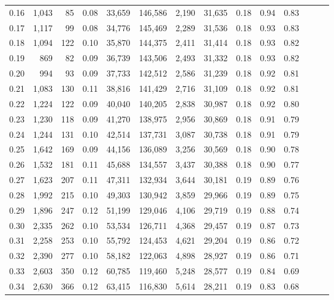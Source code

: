 \begin{tabular}{rrrrrrrrrrrrrr}
0.16 &  1,043 &   85 &  0.08 &   33,659 &  146,586 &   2,190 &  31,635 &  0.18 &  0.94 &      0.83 \\
0.17 &  1,117 &   99 &  0.08 &   34,776 &  145,469 &   2,289 &  31,536 &  0.18 &  0.93 &      0.83 \\
0.18 &  1,094 &  122 &  0.10 &   35,870 &  144,375 &   2,411 &  31,414 &  0.18 &  0.93 &      0.82 \\
0.19 &    869 &   82 &  0.09 &   36,739 &  143,506 &   2,493 &  31,332 &  0.18 &  0.93 &      0.82 \\
0.20 &    994 &   93 &  0.09 &   37,733 &  142,512 &   2,586 &  31,239 &  0.18 &  0.92 &      0.81 \\
0.21 &  1,083 &  130 &  0.11 &   38,816 &  141,429 &   2,716 &  31,109 &  0.18 &  0.92 &      0.81 \\
0.22 &  1,224 &  122 &  0.09 &   40,040 &  140,205 &   2,838 &  30,987 &  0.18 &  0.92 &      0.80 \\
0.23 &  1,230 &  118 &  0.09 &   41,270 &  138,975 &   2,956 &  30,869 &  0.18 &  0.91 &      0.79 \\
0.24 &  1,244 &  131 &  0.10 &   42,514 &  137,731 &   3,087 &  30,738 &  0.18 &  0.91 &      0.79 \\
0.25 &  1,642 &  169 &  0.09 &   44,156 &  136,089 &   3,256 &  30,569 &  0.18 &  0.90 &      0.78 \\
0.26 &  1,532 &  181 &  0.11 &   45,688 &  134,557 &   3,437 &  30,388 &  0.18 &  0.90 &      0.77 \\
0.27 &  1,623 &  207 &  0.11 &   47,311 &  132,934 &   3,644 &  30,181 &  0.19 &  0.89 &      0.76 \\
0.28 &  1,992 &  215 &  0.10 &   49,303 &  130,942 &   3,859 &  29,966 &  0.19 &  0.89 &      0.75 \\
0.29 &  1,896 &  247 &  0.12 &   51,199 &  129,046 &   4,106 &  29,719 &  0.19 &  0.88 &      0.74 \\
0.30 &  2,335 &  262 &  0.10 &   53,534 &  126,711 &   4,368 &  29,457 &  0.19 &  0.87 &      0.73 \\
0.31 &  2,258 &  253 &  0.10 &   55,792 &  124,453 &   4,621 &  29,204 &  0.19 &  0.86 &      0.72 \\
0.32 &  2,390 &  277 &  0.10 &   58,182 &  122,063 &   4,898 &  28,927 &  0.19 &  0.86 &      0.71 \\
0.33 &  2,603 &  350 &  0.12 &   60,785 &  119,460 &   5,248 &  28,577 &  0.19 &  0.84 &      0.69 \\
0.34 &  2,630 &  366 &  0.12 &   63,415 &  116,830 &   5,614 &  28,211 &  0.19 &  0.83 &      0.68 \\

\end{tabular}
